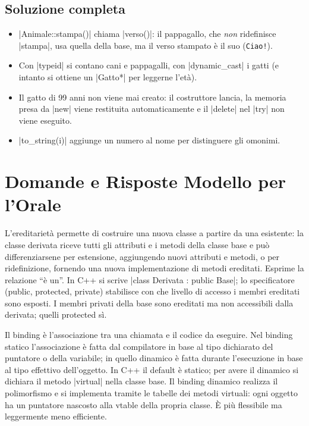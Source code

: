 \subsection*{Soluzione completa}

\begin{consiglio}
\begin{itemize}
  \item \cc|Animale::stampa()| chiama \cc|verso()|: il pappagallo, che \emph{non}
        ridefinisce \cc|stampa|, usa quella della base, ma il verso stampato è il suo
        (\texttt{Ciao!}).
  \item Con \cc|typeid| si contano cani e pappagalli, con \cc|dynamic_cast| i gatti
        (e intanto si ottiene un \cc|Gatto*| per leggerne l'età).
  \item Il gatto di 99 anni non viene mai creato: il costruttore lancia, la memoria
        presa da \cc|new| viene restituita automaticamente e il \cc|delete| nel
        \cc|try| non viene eseguito.
  \item \cc|to_string(i)| aggiunge un numero al nome per distinguere gli omonimi.
\end{itemize}
\end{consiglio}

\section{Domande e Risposte Modello per l'Orale}

\begin{orale}
L'ereditarietà permette di costruire una nuova classe a partire da una esistente: la
classe derivata riceve tutti gli attributi e i metodi della classe base e può
differenziarsene per estensione, aggiungendo nuovi attributi e metodi, o per
ridefinizione, fornendo una nuova implementazione di metodi ereditati. Esprime la
relazione ``è un''. In C++ si scrive \cc|class Derivata : public Base|; lo specificatore
(public, protected, private) stabilisce con che livello di accesso i membri ereditati
sono esposti. I membri privati della base sono ereditati ma non accessibili dalla
derivata; quelli protected sì.
\end{orale}

\begin{orale}
Il binding è l'associazione tra una chiamata e il codice da eseguire. Nel binding
statico l'associazione è fatta dal compilatore in base al tipo dichiarato del puntatore
o della variabile; in quello dinamico è fatta durante l'esecuzione in base al tipo
effettivo dell'oggetto. In C++ il default è statico; per avere il dinamico si dichiara
il metodo \cc|virtual| nella classe base. Il binding dinamico realizza il polimorfismo e
si implementa tramite le tabelle dei metodi virtuali: ogni oggetto ha un puntatore
nascosto alla vtable della propria classe. È più flessibile ma leggermente meno efficiente.
\end{orale}

